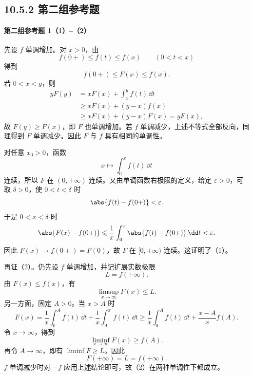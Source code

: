 \subsection*{10.5.2 第二组参考题}

\paragraph{第二组参考题 1（1）--（2）}
\begin{xsolution}
先设 $f$ 单调增加。对 $x>0$，由
\[
  f(0+)\leqslant f(t)\leqslant f(x)\qquad(0<t<x)
\]
得到
\[
  f(0+)\leqslant F(x)\leqslant f(x).
\]
若 $0<x<y$，则
\begin{align*}
  yF(y)
  &=xF(x)+\int_x^y f(t)\,\dd t\\
  &\geqslant xF(x)+(y-x)f(x)\\
  &\geqslant xF(x)+(y-x)F(x)=yF(x),
\end{align*}
故 $F(y)\geqslant F(x)$，即 $F$ 也单调增加。若 $f$ 单调减少，上述不等式全部反向，同理得到 $F$ 单调减少。因此 $F$ 与 $f$ 具有相同的单调性。

对任意 $x_0>0$，函数
\[
  x\longmapsto\int_0^x f(t)\,\dd t
\]
连续，所以 $F$ 在 $(0,+\infty)$ 连续。又由单调函数右极限的定义，给定 $\varepsilon>0$，可取 $\delta>0$，使 $0<t<\delta$ 时
\[
  \abs{f(t)-f(0+)}<\varepsilon.
\]
于是 $0<x<\delta$ 时
\[
  \abs{F(x)-f(0+)}
  \leqslant\frac1x\int_0^x\abs{f(t)-f(0+)}\,\dd t<\varepsilon.
\]
因此 $F(x)\to f(0+)=F(0)$，故 $F$ 在 $[0,+\infty)$ 连续。这证明了（1）。

再证（2）。仍先设 $f$ 单调增加，并记扩展实数极限
\[
  L=f(+\infty).
\]
由 $F(x)\leqslant f(x)$，有
\[
  \limsup_{x\to\infty}F(x)\leqslant L.
\]
另一方面，固定 $A>0$。当 $x>A$ 时
\[
  F(x)=\frac1x\int_0^A f(t)\,\dd t
  +\frac1x\int_A^x f(t)\,\dd t
  \geqslant\frac1x\int_0^A f(t)\,\dd t
  +\frac{x-A}{x}f(A).
\]
令 $x\to\infty$，得到
\[
  \liminf_{x\to\infty}F(x)\geqslant f(A).
\]
再令 $A\to\infty$，即有 $\liminf F\geqslant L$。因此
\[
  F(+\infty)=L=f(+\infty).
\]
$f$ 单调减少时对 $-f$ 应用上述结论即可，故（2）在两种单调性下都成立。
\end{xsolution}

